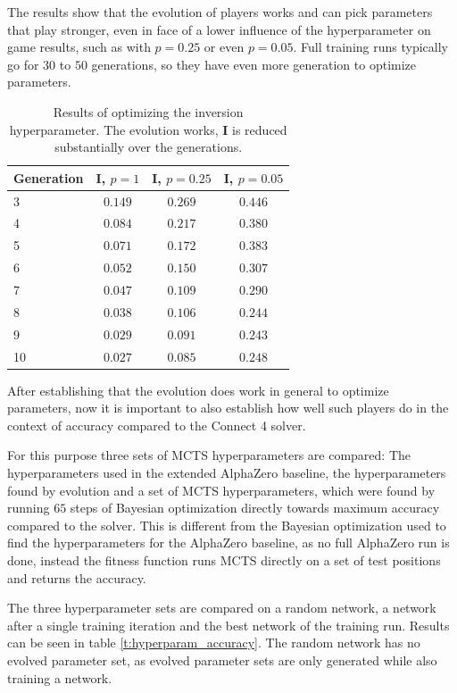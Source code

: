 \documentclass[12pt,onecolumn,oneside,titlepage]{article}
\begin{document}
The results show that the evolution of players works and can pick parameters that play stronger, even in face of a lower influence of the hyperparameter on game results, such as with $p = 0.25$ or even $p = 0.05$.
Full training runs typically go for $30$ to $50$ generations, so they have even more generation to optimize parameters.

\begin{table} [H]
 \centering
  \begin{tabular}{ l | c c c }
  Generation & $\mathbf{I}$, $p = 1$ & $\mathbf{I}$, $p = 0.25$ & $\mathbf{I}$, $p = 0.05$ \\
  \hline
  3 & $0.149$ & $0.269$ & $0.446$ \\
  4 & $0.084$ & $0.217$ & $0.380$ \\
  5 & $0.071$ & $0.172$ & $0.383$ \\
  6 & $0.052$ & $0.150$ & $0.307$ \\
  7 & $0.047$ & $0.109$ & $0.290$ \\
  8 & $0.038$ & $0.106$ & $0.244$ \\
  9 & $0.029$ & $0.091$ & $0.243$ \\
  10 & $0.027$ & $0.085$ & $0.248$ \\
  \end{tabular}
  \caption{Results of optimizing the inversion hyperparameter. The evolution works, $\mathbf{I}$ is reduced substantially over the generations.}
  \label{t:inversion_results}
\end{table}


After establishing that the evolution does work in general to optimize parameters, now it is important to also establish how well such players do in the context of accuracy compared to the Connect 4 solver.

For this purpose three sets of MCTS hyperparameters are compared: The hyperparameters used in the extended AlphaZero baseline, the hyperparameters found by evolution and a set of MCTS hyperparameters, which were found by running $65$ steps of Bayesian optimization
directly towards maximum accuracy compared to the solver. This is different from the Bayesian optimization used to find the hyperparameters for the AlphaZero baseline, as no full AlphaZero run is done, instead the fitness function runs MCTS directly on a set of test positions and returns
the accuracy.

The three hyperparameter sets are compared on a random network, a network after a single training iteration and the best network of the training run. Results can be seen in table \ref{t:hyperparam_accuracy}. The random network has no evolved
parameter set, as evolved parameter sets are only generated while also training a network.
\end{document}
